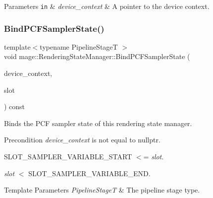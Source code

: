 \begin{DoxyParams}[1]{Parameters}
\mbox{\tt in}  & {\em device\+\_\+context} & A pointer to the device context. \\
\hline
\end{DoxyParams}
\hypertarget{classmage_1_1_rendering_state_manager_a2db1a0d4f5a6184d21886fdf02153d0b}{}\label{classmage_1_1_rendering_state_manager_a2db1a0d4f5a6184d21886fdf02153d0b} 
\subsubsection{\texorpdfstring{Bind\+P\+C\+F\+Sampler\+State()}{BindPCFSamplerState()}}
{\footnotesize\ttfamily template$<$typename Pipeline\+StageT $>$ \\
void mage\+::\+Rendering\+State\+Manager\+::\+Bind\+P\+C\+F\+Sampler\+State (\begin{DoxyParamCaption}\item[{I\+D3\+D11\+Device\+Context2 $\ast$}]{device\+\_\+context,  }\item[{\hyperlink{namespacemage_a41c104c036fba3756a74e19f793eeaa1}{U32}}]{slot }\end{DoxyParamCaption}) const\hspace{0.3cm}{\ttfamily [noexcept]}}

Binds the P\+CF sampler state of this rendering state manager.

\begin{DoxyPrecond}{Precondition}
{\itshape device\+\_\+context} is not equal to {\ttfamily nullptr}. 

{\ttfamily S\+L\+O\+T\+\_\+\+S\+A\+M\+P\+L\+E\+R\+\_\+\+V\+A\+R\+I\+A\+B\+L\+E\+\_\+\+S\+T\+A\+RT} $<$= {\itshape slot}. 

{\itshape slot} $<$ {\ttfamily S\+L\+O\+T\+\_\+\+S\+A\+M\+P\+L\+E\+R\+\_\+\+V\+A\+R\+I\+A\+B\+L\+E\+\_\+\+E\+ND}. 
\end{DoxyPrecond}

\begin{DoxyTemplParams}{Template Parameters}
{\em Pipeline\+StageT} & The pipeline stage type. \\
\hline
\end{DoxyTemplParams}

